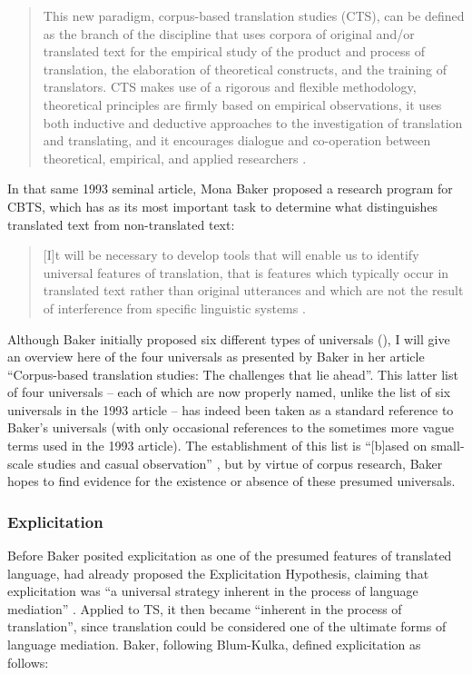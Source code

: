\begin{quote}
This new paradigm, corpus-based translation studies (CTS), can be defined as the branch of the discipline that uses corpora of original and\slash or translated text for the empirical study of the product and process of translation, the elaboration of theoretical constructs, and the training of translators. CTS makes use of a rigorous and flexible methodology, theoretical principles are firmly based on empirical observations, it uses both inductive and deductive approaches to the investigation of translation and translating, and it encourages dialogue and co-operation between theoretical, empirical, and applied researchers \citep[45]{granger_corpora_2003}.
\end{quote}

In that same 1993 seminal article, Mona Baker proposed a research program for CBTS, which has as its most important task to determine what distinguishes translated text from non-translated text:

\begin{quote}
[I]t will be necessary to develop tools that will enable us to identify universal features of translation, that is features which typically occur in translated text rather than original utterances and which are not the result of interference from specific linguistic systems \citep[243]{baker_corpus_1993}.
\end{quote}

Although Baker initially proposed six different types of universals (\citeyear[243--245]{baker_corpus_1993}), I will give an overview here of the four universals as presented by Baker in her \citeyear{baker_corpus-based_1996} article “Corpus-based translation studies: The challenges that lie ahead”. This latter list of four universals – each of which are now properly named, unlike the list of six universals in the 1993 article – has indeed been taken as a standard reference to Baker’s universals (with only occasional references to the sometimes more vague terms used in the 1993 article). The establishment of this list is “[b]ased on small-scale studies and casual observation” \citep[243]{baker_corpus_1993}, but by virtue of corpus research, Baker hopes to find evidence for the existence or absence of these presumed universals.

\subsubsection{Explicitation}
\label{sec:2.2.2.1}  
Before Baker posited explicitation as one of the presumed features of translated language, \citet{house_shifts_1986} had already proposed the Explicitation Hypothesis, claiming that explicitation was “a universal strategy inherent in the process of language mediation” \citep[21]{house_shifts_1986}. Applied to TS, it then became “inherent in the process of translation”, since translation could be considered one of the ultimate forms of language mediation. Baker, following Blum-Kulka, defined explicitation as follows:

